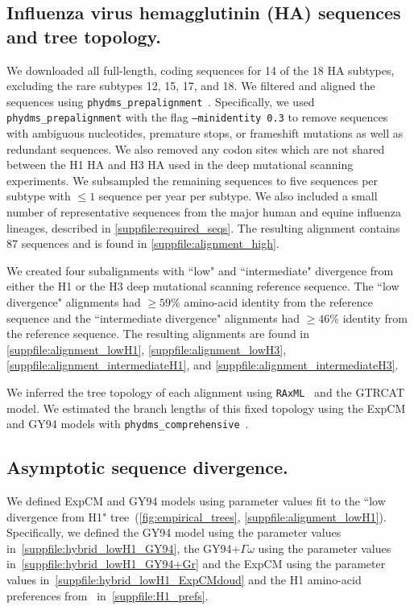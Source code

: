 \documentclass[11pt]{article}
\begin{document}
\subsection*{Influenza virus hemagglutinin (HA) sequences and tree topology.}

We downloaded all full-length, coding sequences for 14 of the 18 HA subtypes, excluding the rare subtypes 12, 15, 17, and 18. 
We filtered and aligned the sequences using \texttt{phydms\_prepalignment}~\citep{hilton2017phydms}. 
Specifically, we used \texttt{phydms\_prepalignment} with the flag \texttt{--minidentity 0.3} to remove sequences with ambiguous nucleotides, premature stops, or frameshift mutations as well as redundant sequences.  
We also removed any codon sites which are not shared between the H1 HA and H3 HA used in the deep mutational scanning experiments. 
We subsampled the remaining sequences to five sequences per subtype with $\le 1$ sequence per year per subtype. 
We also included a small number of representative sequences from the major human and equine influenza lineages, described in \ref{suppfile:required_seqs}. 
The resulting alignment contains 87 sequences and is found in \ref{suppfile:alignment_high}. 

We created four subalignments with ``low" and ``intermediate" divergence from either the H1 or the H3 deep mutational scanning reference sequence. 
The ``low divergence" alignments had   $\ge 59\%$ amino-acid identity from the reference sequence and the ``intermediate divergence" alignments had $\ge 46\%$ identity from the reference sequence.
The resulting alignments are found in \ref{suppfile:alignment_lowH1}, \ref{suppfile:alignment_lowH3}, \ref{suppfile:alignment_intermediateH1}, and \ref{suppfile:alignment_intermediateH3}.  

We inferred the tree topology of each alignment using \texttt{RAxML}~\citep{stamatakis2006raxml} and the GTRCAT model. 
We estimated the branch lengths of this fixed topology using the ExpCM and GY94 models with \texttt{phydms\_comprehensive}~\citep{hilton2017phydms}. 

\subsection*{Asymptotic sequence divergence.}

We defined ExpCM and GY94 models using parameter values fit to the ``low divergence from H1" tree~(\ref{fig:empirical_trees}, \ref{suppfile:alignment_lowH1}). 
Specifically, we defined the GY94 model using the parameter values in~\ref{suppfile:hybrid_lowH1_GY94}, the GY94+$\Gamma\omega$ using the parameter values in~\ref{suppfile:hybrid_lowH1_GY94+Gr} and the ExpCM using the parameter values in~\ref{suppfile:hybrid_lowH1_ExpCMdoud} and the H1 amino-acid preferences from~\citet{doud2016accurate} in~\ref{suppfile:H1_prefs}. 
\end{document}

